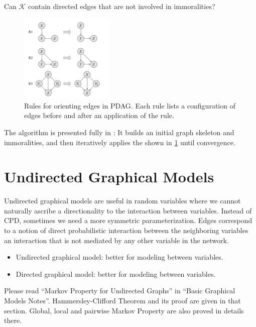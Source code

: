 \documentclass{article}
\begin{document}
 Can $\mathcal{K}$  contain directed edges that are not involved in immoralities? 

\begin{figure}[H]
    \centering
    \includegraphics[width=0.4\textwidth]{Figs/a12.png}
    \caption{Rules for orienting edges in PDAG. Each rule lists a configuration of edges before and after an application of the rule.}
    \label{fig:jtrsfsd}
\end{figure}

The algorithm is presented fully in \cite[algorithm 3.5.]{koller2009probabilistic}: It builds an initial graph skeleton and immoralities, and then iteratively applies the  shown in \cref{fig:jtrsfsd} until convergence.

\section{Undirected Graphical Models}
Undirected graphical models are useful in random variables where we cannot naturally ascribe a directionality to the interaction between variables. Instead of CPD, sometimes we need a more symmetric parameterization. Edges correspond to a notion of direct probabilistic interaction between the neighboring variables an interaction that is not mediated by any other variable in the network. 
\begin{itemize}
    \item Undirected graphical model: better for modeling  between variables.
    \item Directed graphical model: better for modeling  between variables.
\end{itemize}
Please read ``{Markov Property for Undirected Graphs}'' in ``Basic Graphical Models Notes''. Hammersley-Clifford Theorem and its proof are given in that section. Global, local and pairwise Markov Property are also proved in details there.
\end{document}
